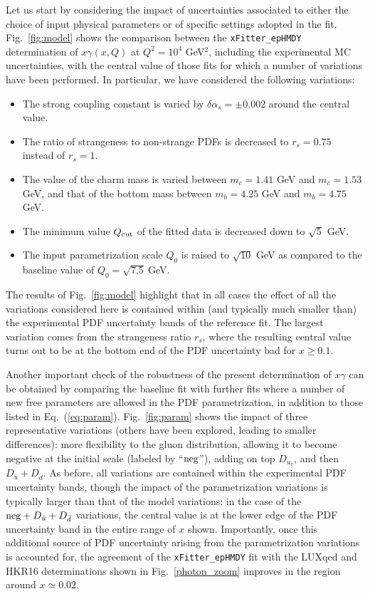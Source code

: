 Let us start by considering the impact of uncertainties associated to either
the choice of input physical parameters or of specific settings
adopted in the fit.
%
Fig.~\ref{fig:model} shows the comparison between the
{\tt xFitter\_epHMDY} 
determination of $x\gamma(x,Q)$ at $Q^2=10^4$ GeV$^2$, including the experimental MC
uncertainties, with the central
value of those fits for which a number of variations have been
performed.
%
In particular, we have considered the following variations:
\begin{itemize}
\item The strong coupling constant is varied by $\delta \alpha_s=\pm 0.002$ around the central value.
\item The ratio of strangeness to non-strange PDFs is decreased to $r_s=0.75$ instead of $r_s=1$.
\item The value of the charm mass is varied between $m_c=1.41$ GeV and $m_c=1.53$ GeV,
  and that of the bottom mass between $m_b=4.25$ GeV and $m_b=4.75$ GeV.
\item The minimum value $Q_{\rm cut}$ of the fitted data is decreased down to $\sqrt{5}$ GeV.
\item The input parametrization scale $Q_0$ is raised to $\sqrt{10}$ GeV as compared
  to the baseline value of $Q_0=\sqrt{7.5}~$GeV.
\end{itemize}
The results of Fig.~\ref{fig:model} highlight that in all cases the effect
of all the variations considered here is contained within (and typically much smaller than) 
the experimental PDF uncertainty bands of the reference fit.
%
The largest variation comes from the strangeness ratio $r_s$, where the resulting
central value turns out to be at the bottom end of the PDF uncertainty bad for $x\ge 0.1$.

Another important check of the robustness of the present determination of
$x\gamma$ can be obtained by comparing the baseline fit with further
fits where a number of new free parameters are allowed in the PDF
parametrization, in addition to those listed in Eq.~(\ref{eq:param}).
%
Fig.~\ref{fig:param} shows the impact of three representative
variations (others have been explored, leading to smaller
differences): more flexibility to the gluon distribution, allowing it
to become negative at the initial scale (labeled by ``${\rm neg}$''), adding on top $D_{u_v}$,
and then $D_{\bar{u}}+D_{\bar{d}}$.
%
As before, all variations are contained within the experimental PDF uncertainty
bands, though the impact of the parametrization variations is typically larger
than that of the model variations: in the case of the
${\rm neg}+D_{\bar{u}}+D_{\bar{d}}$ variations, the central value is
at the lower edge of the PDF uncertainty band in the entire range
of $x$ shown.
%
Importantly, once this additional source of PDF uncertainty arising from the
parametrization variations is accounted for, the agreement of the {\tt xFitter\_epHMDY}
fit 
with the LUXqed and HKR16  determinations
shown in Fig.~\ref{photon_zoom} improves in the
region around $x\simeq 0.02$.

